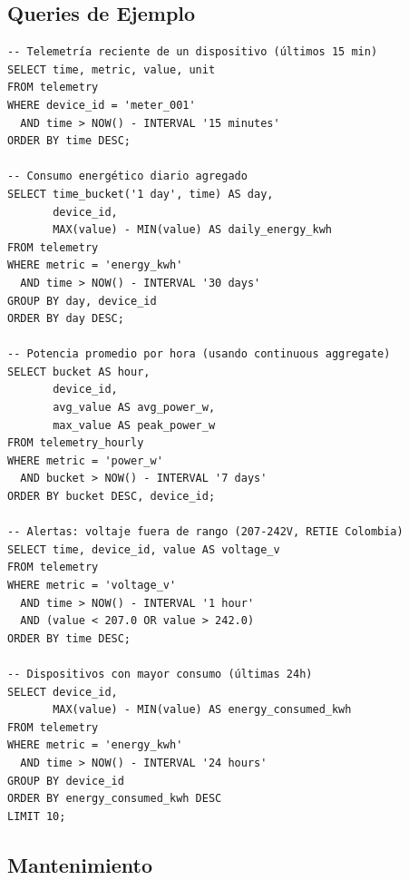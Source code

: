 \subsection{Queries de Ejemplo}

\begin{verbatim}
-- Telemetría reciente de un dispositivo (últimos 15 min)
SELECT time, metric, value, unit
FROM telemetry
WHERE device_id = 'meter_001' 
  AND time > NOW() - INTERVAL '15 minutes'
ORDER BY time DESC;

-- Consumo energético diario agregado
SELECT time_bucket('1 day', time) AS day,
       device_id,
       MAX(value) - MIN(value) AS daily_energy_kwh
FROM telemetry
WHERE metric = 'energy_kwh'
  AND time > NOW() - INTERVAL '30 days'
GROUP BY day, device_id
ORDER BY day DESC;

-- Potencia promedio por hora (usando continuous aggregate)
SELECT bucket AS hour,
       device_id,
       avg_value AS avg_power_w,
       max_value AS peak_power_w
FROM telemetry_hourly
WHERE metric = 'power_w'
  AND bucket > NOW() - INTERVAL '7 days'
ORDER BY bucket DESC, device_id;

-- Alertas: voltaje fuera de rango (207-242V, RETIE Colombia)
SELECT time, device_id, value AS voltage_v
FROM telemetry
WHERE metric = 'voltage_v'
  AND time > NOW() - INTERVAL '1 hour'
  AND (value < 207.0 OR value > 242.0)
ORDER BY time DESC;

-- Dispositivos con mayor consumo (últimas 24h)
SELECT device_id,
       MAX(value) - MIN(value) AS energy_consumed_kwh
FROM telemetry
WHERE metric = 'energy_kwh'
  AND time > NOW() - INTERVAL '24 hours'
GROUP BY device_id
ORDER BY energy_consumed_kwh DESC
LIMIT 10;
\end{verbatim}

\subsection{Mantenimiento}

